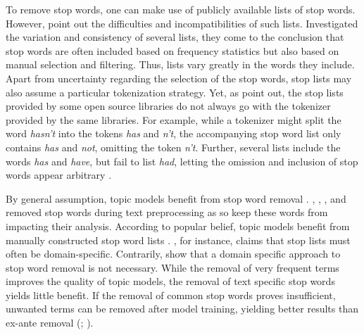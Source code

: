 \documentclass[11pt,a4paper,english,oneside]{book}
\numberwithin{equation}{chapter}
\begin{document}
To remove stop words, one can make use of publicly available lists of stop words. However, \citet{Nothman.2018} point out the difficulties and incompatibilities of such lists. Investigated the variation and consistency of several lists, they come to the conclusion that stop words are often included based on frequency statistics but also based on manual selection and filtering. Thus, lists vary greatly in the words they include. Apart from uncertainty regarding the selection of the stop words, stop lists may also assume a particular tokenization strategy. Yet, as \citet{Nothman.2018} point out, the stop lists provided by some open source libraries do not always go with the tokenizer provided by the same libraries. For example, while a tokenizer might split the word \textit{hasn't} into the tokens \textit{has} and \textit{n't}, the accompanying stop word list only contains \textit{has} and \textit{not}, omitting the token \textit{n't}. Further, several lists include the words \textit{has} and \textit{have}, but fail to list \textit{had}, letting the omission and inclusion of stop words appear arbitrary \citep[pp. 7--11]{Nothman.2018}.  

By general assumption, topic models benefit from stop word removal \cite[p. 432]{SchofieldA.MagnussonM.&MimnoD..2017}. \cite{Blei.2003}, \cite{Chem.2007}, \cite{Steyvers(2007)}, and \cite{Hofmann.2001} removed stop words during text preprocessing as so keep these words from impacting their analysis. According to popular belief, topic models benefit from manually constructed stop word lists \cite[p. 432]{SchofieldA.MagnussonM.&MimnoD..2017}. \citet[p. 7]{Darling.2011}, for instance, claims that stop lists must often be domain-specific. Contrarily, \cite{SchofieldA.MagnussonM.&MimnoD..2017} show that a domain specific approach to stop word removal is not necessary. While the removal of very frequent terms improves the quality of topic models, the removal of text specific stop words yields little benefit. If the removal of common stop words proves insufficient, unwanted terms can be removed after model training, yielding better results than ex-ante removal (\citealp[p. 432]{SchofieldA.MagnussonM.&MimnoD..2017}; \citealp{Schofield.2017}).
\end{document}
